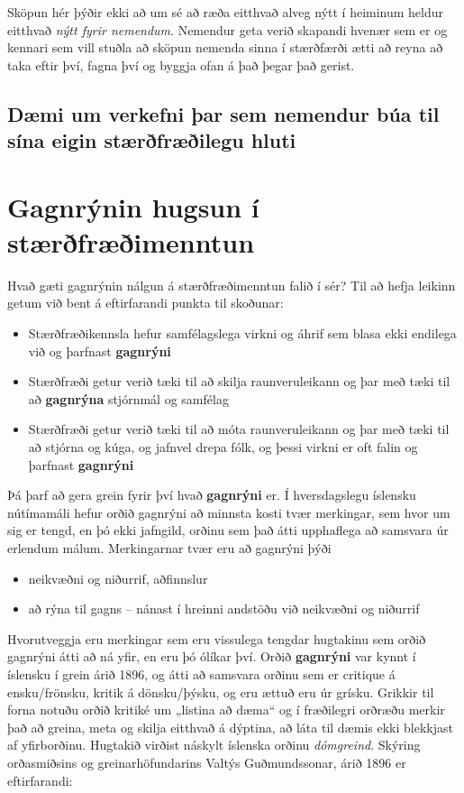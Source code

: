 \documentclass[
  icelandic,
]{book}
\providecommand{\tightlist}{%
  \setlength{\itemsep}{0pt}\setlength{\parskip}{0pt}}
\theoremstyle{definition}
\theoremstyle{definition}
\theoremstyle{definition}
\theoremstyle{definition}
\theoremstyle{remark}
\begin{document}
Sköpun hér þýðir ekki að um sé að ræða eitthvað alveg nýtt í heiminum heldur eitthvað \emph{nýtt fyrir nemendum}. Nemendur geta verið skapandi hvenær sem er og kennari sem vill stuðla að sköpun nemenda sinna í stærðfærði ætti að reyna að taka eftir því, fagna því og byggja ofan á það þegar það gerist.

\section{Dæmi um verkefni þar sem nemendur búa til sína eigin stærðfræðilegu hluti}\label{duxe6mi-um-verkefni-uxfear-sem-nemendur-buxfaa-til-suxedna-eigin-stuxe6ruxf0fruxe6uxf0ilegu-hluti}

\chapter{Gagnrýnin hugsun í stærðfræðimenntun}\label{gagnryni}

Hvað gæti gagnrýnin nálgun á stærðfræðimenntun falið í sér? Til að hefja leikinn getum við bent á eftirfarandi punkta til skoðunar:

\begin{itemize}
\tightlist
\item
  Stærðfræðikennsla hefur samfélagslega virkni og áhrif sem blasa ekki endilega við og þarfnast \textbf{gagnrýni}
\item
  Stærðfræði getur verið tæki til að skilja raunveruleikann og þar með tæki til að \textbf{gagnrýna} stjórnmál og samfélag
\item
  Stærðfræði getur verið tæki til að móta raunveruleikann og þar með tæki til að stjórna og kúga, og jafnvel drepa fólk, og þessi virkni er oft falin og þarfnast \textbf{gagnrýni}
\end{itemize}

Þá þarf að gera grein fyrir því hvað \textbf{gagnrýni} er. Í hversdagslegu íslensku nútímamáli hefur orðið gagnrýni að minnsta kosti tvær merkingar, sem hvor um sig er tengd, en þó ekki jafngild, orðinu sem það átti upphaflega að samsvara úr erlendum málum. Merkingarnar tvær eru að gagnrýni þýði

\begin{itemize}
\tightlist
\item
  neikvæðni og niðurrif, aðfinnslur
\item
  að rýna til gagns -- nánast í hreinni andstöðu við neikvæðni og niðurrif
\end{itemize}

Hvorutveggja eru merkingar sem eru vissulega tengdar hugtakinu sem orðið gagnrýni átti að ná yfir, en eru þó ólíkar því. Orðið \textbf{gagnrýni} var kynnt í íslensku í grein árið 1896, og átti að samsvara orðinu sem er critique á ensku/frönsku, kritik á dönsku/þýsku, og eru ættuð eru úr grísku. Grikkir til forna notuðu orðið kritiké um „listina að dæma`` og í fræðilegri orðræðu merkir það að greina, meta og skilja eitthvað á dýptina, að láta til dæmis ekki blekkjast af yfirborðinu. Hugtakið virðist náskylt íslenska orðinu \emph{dómgreind}. Skýring orðasmiðsins og greinarhöfundarins Valtýs Guðmundssonar, árið 1896 er eftirfarandi:
\end{document}

